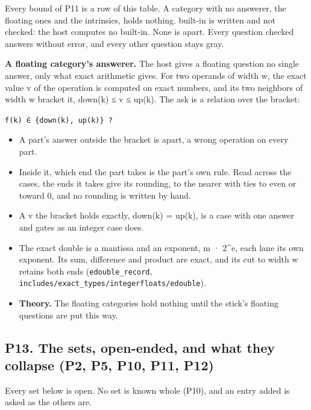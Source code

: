Every bound of P11 is a row of this table. A category with no answerer, the floating ones and the intrinsics, holds nothing. built-in is written and not checked: the host computes no built-in. None is apart. Every question checked answers without error, and every other question stays gray.

\textbf{A floating category's answerer.} The host gives a floating question no single answer, only what exact arithmetic gives. For two operands of width w, the exact value v of the operation is computed on exact numbers, and its two neighbors of width w bracket it, down(k) ≤ v ≤ up(k). The ask is a relation over the bracket:

\texttt{f(k) ∈ \{down(k), up(k)\} ?}

\begin{itemize}
\item A part's answer outside the bracket is apart, a wrong operation on every part.
\item Inside it, which end the part takes is the part's own rule. Read across the cases, the ends it takes give its rounding, to the nearer with ties to even or toward 0, and no rounding is written by hand.
\item A v the bracket holds exactly, down(k) = up(k), is a case with one answer and gates as an integer case does.
\item The exact double is a mantissa and an exponent, m · 2\textasciicircum{}e, each lane its own exponent. Its sum, difference and product are exact, and its cut to width w retains both ends (\texttt{edouble\_\allowbreak{}record}, \texttt{includes/\allowbreak{}exact\_\allowbreak{}types/\allowbreak{}integerfloats/\allowbreak{}edouble}).
\item \textbf{Theory.} The floating categories hold nothing until the stick's floating questions are put this way.
\end{itemize}

\subsection{\texorpdfstring{P13. The sets, open-ended, and what they collapse (P2, P5, P10, P11, P12)}{P13. The sets, open-ended, and what they collapse (P2, P5, P10, P11, P12)}}

Every set below is open. No set is known whole (P10), and an entry added is asked as the others are.

